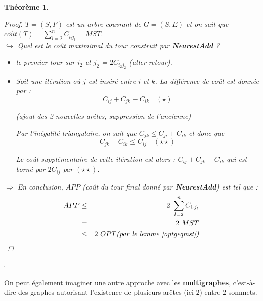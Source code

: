 \documentclass{article}
\newcommand{\cqfd}{\begin{flushright}$\square$\end{flushright}}
\newtheorem{thm}{Th\'eor\`eme}[section]
\newtheorem{proof}{Preuve}[section]
\begin{document}
\begin{sffamily}
\begin{thm}
\begin{proof}
\noindent $T = (S,F)$ est un arbre couvrant de $G=(S,E)$ et on sait que $co\hat{u}t(T) = \sum_{l=2}^n C_{i_lj_l} = MST$.\\
$\hookrightarrow$ Quel est le coût maximimal du tour construit par \textbf{NearestAdd} ?
\begin{itemize}
\item[$\rightarrow$] le premier tour sur $i_2$ et $j_2$ = $2C_{i_2j_2}$ (aller-retour).
\item[$\rightarrow$] Soit une itération où $j$ est inséré entre $i$ et $k$. La différence de coût est donnée par : 
$$C_{ij}+C_{jk}-C_{ik}\quad (\star )$$
\begin{center}\textit{(ajout des 2 nouvelles arêtes, suppression de l'ancienne)}\end{center}
Par l'inégalité triangulaire, on sait que $C_{jk}\leq C_{ji} + C_{ik}$ et donc que 
$$C_{jk}-C_{ik} \leq C_{ij}\quad (\star\star )$$
   
Le coût supplémentaire de cette itération est alors : $C_{ij}+C_{jk}-C_{ik}$ qui est borné par $2C_{ij}$ par $(\star\star )$. \\
\end{itemize}

\noindent $\Rightarrow$ En conclusion, $APP$ (coût du tour final donné par \textbf{NearestAdd}) est tel que : 
\begin{eqnarray}
\nonumber APP &\leq& 2\ \sum_{l=2}^n C_{i_lj_l} \\
\nonumber     & =  & 2\ MST \\
\nonumber     & \leq & 2\ OPT \text{\textit{(par le lemme \ref{optgeqmst})}}
\end{eqnarray}
\end{proof}
\cqfd
\end{thm}

On peut également imaginer une autre approche avec les \textbf{multigraphes}, c'est-à-dire des graphes autorisant l'existence de plusieurs 
arêtes (ici $2$) entre $2$ sommets.


\end{sffamily}
\end{document}
